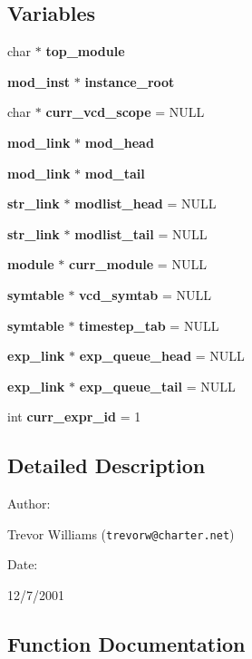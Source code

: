 \subsection*{Variables}
\begin{CompactItemize}
\item 
char $\ast$ {\bf top\_\-module}
\item 
{\bf mod\_\-inst} $\ast$ {\bf instance\_\-root}
\item 
char $\ast$ {\bf curr\_\-vcd\_\-scope} = NULL
\item 
{\bf mod\_\-link} $\ast$ {\bf mod\_\-head}
\item 
{\bf mod\_\-link} $\ast$ {\bf mod\_\-tail}
\item 
{\bf str\_\-link} $\ast$ {\bf modlist\_\-head} = NULL
\item 
{\bf str\_\-link} $\ast$ {\bf modlist\_\-tail} = NULL
\item 
{\bf module} $\ast$ {\bf curr\_\-module} = NULL
\item 
{\bf symtable} $\ast$ {\bf vcd\_\-symtab} = NULL
\item 
{\bf symtable} $\ast$ {\bf timestep\_\-tab} = NULL
\item 
{\bf exp\_\-link} $\ast$ {\bf exp\_\-queue\_\-head} = NULL
\item 
{\bf exp\_\-link} $\ast$ {\bf exp\_\-queue\_\-tail} = NULL
\item 
int {\bf curr\_\-expr\_\-id} = 1
\end{CompactItemize}


\subsection{Detailed Description}


\begin{Desc}
\item[Author: ]\par
Trevor Williams ({\tt trevorw@charter.net}) \end{Desc}
\begin{Desc}
\item[Date: ]\par
12/7/2001\end{Desc}


\subsection{Function Documentation}
